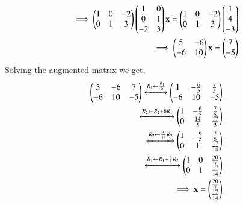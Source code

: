 \documentclass[journal,12pt,twocolumn]{IEEEtran}
\begin{document}
\begin{align}
\implies \begin{pmatrix}1&0&-2\\0&1&3\end{pmatrix} \begin{pmatrix}1&0\\0&1\\-2&3\end{pmatrix} \mathbf{x} = \begin{pmatrix}1&0&-2\\0&1&3\end{pmatrix}\begin{pmatrix}1\\4\\-3\end{pmatrix}\\
\implies \begin{pmatrix}5&-6\\-6&10\end{pmatrix}\mathbf{x} = \begin{pmatrix}7\\-5\end{pmatrix}
\end{align}
Solving the augmented matrix we get,
\begin{align}
\begin{pmatrix}5&-6&7\\-6&10&-5\end{pmatrix}\xleftrightarrow[]{R_1\leftarrow\frac{R_1}{5}}\begin{pmatrix}1&-\frac{6}{5}&\frac{7}{5}\\-6&10&-5\end{pmatrix}\\
\xleftrightarrow[]{R_2\leftarrow R_2+6R_1}\begin{pmatrix}1&-\frac{6}{5}&\frac{7}{5}\\0&\frac{14}{5}&\frac{17}{5}\end{pmatrix}\\
\xleftrightarrow[]{R_2\leftarrow \frac{5}{14}R_2}\begin{pmatrix}1&-\frac{6}{5}&\frac{7}{5}\\0&1&\frac{17}{14}\end{pmatrix}\\
\xleftrightarrow[]{R_1\leftarrow R_1+\frac{6}{5}R_2}\begin{pmatrix}1&0&\frac{20}{7}\\0&1&\frac{17}{14}\end{pmatrix}\\
\implies \mathbf{x} = \begin{pmatrix}\frac{20}{7}\\\frac{17}{14}\end{pmatrix}
\end{align}
\end{document}
